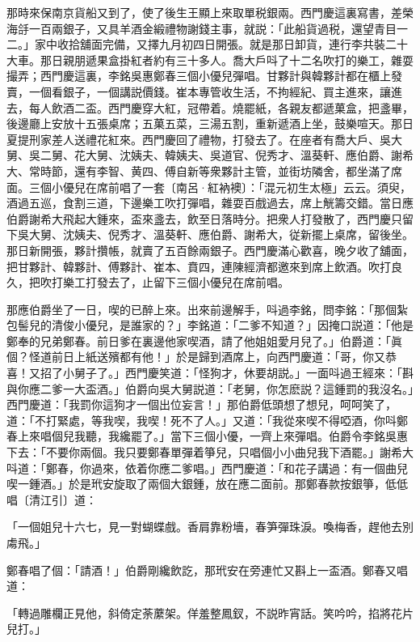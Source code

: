 那時來保南京貨船又到了，使了後生王顯上來取單税銀兩。西門慶這裏寫書，差榮海㧱一百兩銀子，又具羊酒金緞禮物謝錢主事，就説：「此船貨過税，還望青目一二。」家中收拾舖面完備，又擇九月初四日開張。就是那日卸貨，連行李共裝二十大車。那日親朋遞果盒掛紅者約有三十多人。喬大戶呌了十二名吹打的樂工，雜耍撮弄；西門慶這裏，李銘吳惠鄭春三個小優兒彈唱。甘夥計與韓夥計都在櫃上發賣，一個看銀子，一個講説價錢。崔本專管收生活，不拘經紀、買主進來，讓進去，每人飲酒二盃。西門慶穿大紅，冠帶着。燒罷紙，各親友都遞菓盒，把盞畢，後邊廳上安放十五張桌席；五菓五菜，三湯五割，重新遞酒上坐，鼓樂喧天。那日夏提刑家差人送禮花紅來。西門慶回了禮物，打發去了。在座者有喬大戶、吳大舅、吳二舅、花大舅、沈姨夫、韓姨夫、吳道官、倪秀才、溫葵軒、應伯爵、謝希大、常時節，還有李智、黄四、傅自新等衆夥計主管，並街坊隣舍，都坐滿了席面。三個小優兒在席前唱了一套〔南呂·紅衲襖〕：「混元初生太極」云云。須臾，酒過五巡，食割三道，下邊樂工吹打彈唱，雜耍百戲過去，席上觥籌交錯。當日應伯爵謝希大飛起大鍾來，盃來盞去，飲至日落時分。把衆人打發散了，西門慶只留下吳大舅、沈姨夫、倪秀才、溫葵軒、應伯爵、謝希大，従新擺上桌席，留後坐。那日新開張，夥計攢帳，就賣了五百餘兩銀子。西門慶滿心歡喜，晚夕收了舖面，把甘夥計、韓夥計、傅夥計、崔本、賁四，連陳經濟都邀來到席上飲酒。吹打良久，把吹打樂工打發去了，止留下三個小優兒在席前唱。

那應伯爵坐了一日，喫的已醉上來。出來前邊解手，呌過李銘，問李銘：「那個紮包髻兒的清俊小優兒，是誰家的？」李銘道：「二爹不知道？」因掩口説道：「他是鄭奉的兄弟鄭春。前日爹在裏邊他家喫酒，請了他姐姐愛月兒了。」伯爵道：「眞個？怪道前日上紙送殯都有他！」於是歸到酒席上，向西門慶道：「哥，你又恭喜！又招了小舅子了。」西門慶笑道：「怪狗才，休要胡説。」一面呌過王經來：「斟與你應二爹一大盃酒。」伯爵向吳大舅説道：「老舅，你怎麽説？這鍾罰的我沒名。」西門慶道：「我罰你這狗才一個出位妄言！」那伯爵低頭想了想兒，呵呵笑了，道：「不打緊處，等我喫，我喫！死不了人。」又道：「我從來喫不得啞酒，你呌鄭春上來唱個兒我聽，我纔罷了。」當下三個小優，一齊上來彈唱。伯爵令李銘吳惠下去：「不要你兩個。我只要鄭春單彈着箏兒，只唱個小小曲兒我下酒罷。」謝希大呌道：「鄭春，你過來，依着你應二爹唱。」西門慶道：「和花子講過：有一個曲兒喫一鍾酒。」於是玳安旋取了兩個大銀鍾，放在應二面前。那鄭春款按銀箏，低低唱〔清江引〕道：

\begin{myquote}
「一個姐兒十六七，見一對蝴蝶戲。香肩靠粉墻，春笋彈珠淚。喚梅香，趕他去別䖏飛。」
\end{myquote}

鄭春唱了個：「請酒！」伯爵剛纔飲訖，那玳安在旁連忙又斟上一盃酒。鄭春又唱道：

\begin{myquote}
「轉過雕欄正見他，斜倚定荼䕷架。佯羞整鳳釵，不説昨宵話。笑吟吟，掐將花片兒打。」
\end{myquote}

